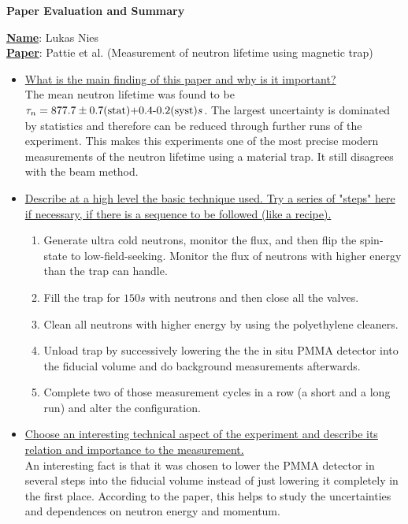 \documentclass[12pt]{article}
\begin{document}
\noindent
\begin{center}
	\centering
	\Large{\textbf{Paper Evaluation and Summary}}
\end{center}
\textbf{\underline{Name}}: Lukas Nies \\
\noindent
\textbf{\underline{Paper}}: Pattie et al. (Measurement of neutron lifetime using magnetic trap) \\[0.5cm]
\noindent
\begin{itemize}
	\item \ul{What is the main finding of this paper and why is it important?} \\
	\noindent
	The mean neutron lifetime was found to be $\tau_n=877.7\pm 0.7\text{(stat)+0.4-0.2\text{(syst)}}s$. The largest uncertainty is dominated by statistics and therefore can be reduced through further runs of the experiment. This makes this experiments one of the most precise modern measurements of the neutron lifetime using a material trap. It still disagrees with the beam method. 
	\item \ul{Describe at a high level the basic technique used. Try a series of "steps" here if necessary, if there is a sequence to be followed (like a recipe).} \\
	\noindent
	\begin{enumerate}
		\item Generate ultra cold neutrons, monitor the flux, and then flip the spin-state to low-field-seeking. Monitor the flux of neutrons with higher energy than the trap can handle.
		\item Fill the trap for $150s$ with neutrons and then close all the valves.
		\item Clean all neutrons with higher energy by using the polyethylene cleaners.
		\item Unload trap by successively lowering the the in situ PMMA detector into the fiducial volume and do background measurements afterwards.
		\item Complete two of those measurement cycles in a row (a short and a long run) and alter the configuration.
	\end{enumerate}
	\item \ul{Choose an interesting technical aspect of the experiment and describe its relation and importance to the measurement.} \\
	\noindent
	An interesting fact is that it was chosen to lower the PMMA detector in several steps into the fiducial volume instead of just lowering it completely in the first place. According to the paper, this helps to study the uncertainties and dependences on neutron energy and momentum.

\end{itemize}
\end{document}
